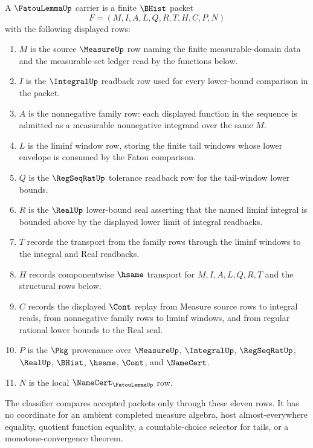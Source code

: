 \begin{definition}
\label{def:fatou-lemma-carrier}
A $\FatouLemmaUp$ carrier is a finite $\BHist$ packet
$$
F=(M,I,A,L,Q,R,T,H,C,P,N)
$$
with the following displayed rows:
\begin{enumerate}
\item $M$ is the source $\MeasureUp$ row naming the finite measurable-domain data and the measurable-set ledger read by the functions below.
\item $I$ is the $\IntegralUp$ readback row used for every lower-bound comparison in the packet.
\item $A$ is the nonnegative family row: each displayed function in the sequence is admitted as a measurable nonnegative integrand over the same $M$.
\item $L$ is the liminf window row, storing the finite tail windows whose lower envelope is consumed by the Fatou comparison.
\item $Q$ is the $\RegSeqRatUp$ tolerance readback row for the tail-window lower bounds.
\item $R$ is the $\RealUp$ lower-bound seal asserting that the named liminf integral is bounded above by the displayed lower limit of integral readbacks.
\item $T$ records the transport from the family rows through the liminf windows to the integral and Real readbacks.
\item $H$ records componentwise $\hsame$ transport for $M,I,A,L,Q,R,T$ and the structural rows below.
\item $C$ records the displayed $\Cont$ replay from Measure source rows to integral reads, from nonnegative family rows to liminf windows, and from regular rational lower bounds to the Real seal.
\item $P$ is the $\Pkg$ provenance over $\MeasureUp$, $\IntegralUp$, $\RegSeqRatUp$, $\RealUp$, $\BHist$, $\hsame$, $\Cont$, and $\NameCert$.
\item $N$ is the local $\NameCert_{\FatouLemmaUp}$ row.
\end{enumerate}
The classifier compares accepted packets only through these eleven rows. It has no coordinate for an ambient completed measure algebra, host almost-everywhere equality, quotient function equality, a countable-choice selector for tails, or a monotone-convergence theorem.
\end{definition}

